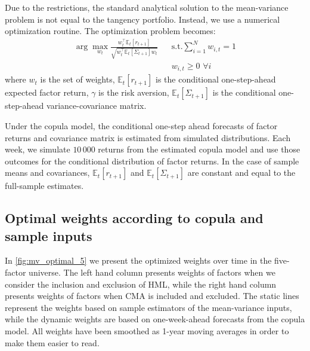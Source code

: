
Due to the restrictions, the standard analytical solution to the mean-variance problem is not equal to the tangency portfolio. Instead, we use a numerical optimization routine. The optimization problem becomes:
\begin{align*}
  \arg\!\max_{w_t} \frac{w_t^\top \mathbb{E}_t[r_{t+1}]}{\sqrt{w_t^\top \mathbb{E}_t[\Sigma_{t+1}] w_t}}
    && \text{s.t.} \sum_{i=1}^N w_{i,t} = 1 \\
    && w_{i,t} \ge 0 \,\, \forall i
\end{align*}
where $w_t$ is the set of weights, $\mathbb{E}_t[r_{t+1}]$ is the conditional one-step-ahead expected factor return, $\gamma$ is the risk aversion, $\mathbb{E}_t[\Sigma_{t+1}]$ is the conditional one-step-ahead variance-covariance matrix. 

Under the copula model, the conditional one-step ahead forecasts of factor returns and covariance matrix is estimated from simulated distributions. Each week, we simulate $10\,000$ returns from the estimated copula model and use those outcomes for the conditional distribution of factor returns. In the case of sample means and covariances, $\mathbb{E}_t[r_{t+1}]$ and $\mathbb{E}_t[\Sigma_{t+1}]$ are constant and equal to the full-sample estimates.

\subsection{Optimal weights according to copula and sample inputs}
In \autoref{fig:mv_optimal_5} we present the optimized weights over time in the five-factor universe. The left hand column presents weights of factors when we consider the inclusion and exclusion of HML, while the right hand column presents weights of factors when CMA is included and excluded. The static lines represent the weights based on sample estimators of the mean-variance inputs, while the dynamic weights are based on one-week-ahead forecasts from the copula model. All weights have been smoothed as 1-year moving averages in order to make them easier to read. 

